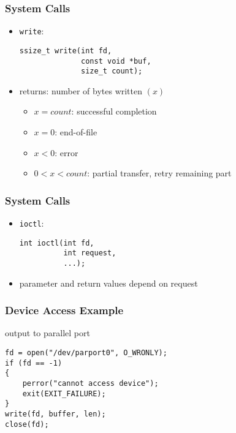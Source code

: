 \documentclass[dvipsnames]{beamer}
\begin{document}
\begin{frame}[fragile]
  \frametitle{System Calls}

  \begin{itemize}
    \item \lstinline|write|:
    \begin{lstlisting}
ssize_t write(int fd,
              const void *buf,
              size_t count);
    \end{lstlisting}
    \item returns: number of bytes written $(x)$
    \begin{itemize}
      \item $x=count$: successful completion
      \item $x=0$: end-of-file
      \item $x<0$: error
      \item $0<x<count$: partial transfer, retry remaining part
    \end{itemize}
  \end{itemize}
\end{frame}

\begin{frame}[fragile]
  \frametitle{System Calls}

  \begin{itemize}
    \item \lstinline|ioctl|:
    \begin{lstlisting}
int ioctl(int fd,
          int request,
          ...);
    \end{lstlisting}
    \item parameter and return values depend on request
  \end{itemize}
\end{frame}

\begin{frame}[fragile]
  \frametitle{Device Access Example}

  \begin{exampleblock}{output to parallel port}
    \begin{lstlisting}
fd = open("/dev/parport0", O_WRONLY);
if (fd == -1)
{
    perror("cannot access device");
    exit(EXIT_FAILURE);
}
write(fd, buffer, len);
close(fd);
    \end{lstlisting}
  \end{exampleblock}
\end{frame}
%
%
%
%
%
\end{document}
